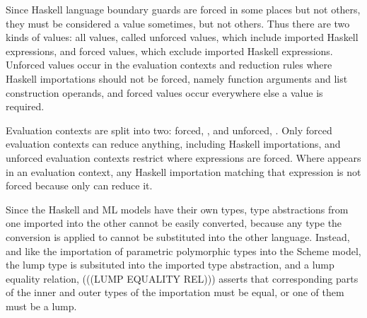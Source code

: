 Since Haskell language boundary guards are forced in some places but not others, they must be considered a value sometimes, but not others. Thus there are two kinds of values: all values, called unforced values, which include imported Haskell expressions, and forced values, which exclude imported Haskell expressions. Unforced values occur in the evaluation contexts and reduction rules where Haskell importations should not be forced, namely function arguments and list construction operands, and forced values occur everywhere else a value is required.

Evaluation contexts are split into two: forced, \varconf, and unforced, \varconu. Only forced evaluation contexts can reduce anything, including Haskell importations, and unforced evaluation contexts restrict where expressions are forced. Where \varconu appears in an evaluation context, any Haskell importation matching that expression is not forced because only \varconf can reduce it.

Since the Haskell and ML models have their own types, type abstractions from one imported into the other cannot be easily converted, because any type the conversion is applied to cannot be substituted into the other language. Instead, and like the importation of parametric polymorphic types into the Scheme model, the lump type is subsituted into the imported type abstraction, and a lump equality relation, (((LUMP EQUALITY REL))) asserts that corresponding parts of the inner and outer types of the importation must be equal, or one of them must be a lump.

